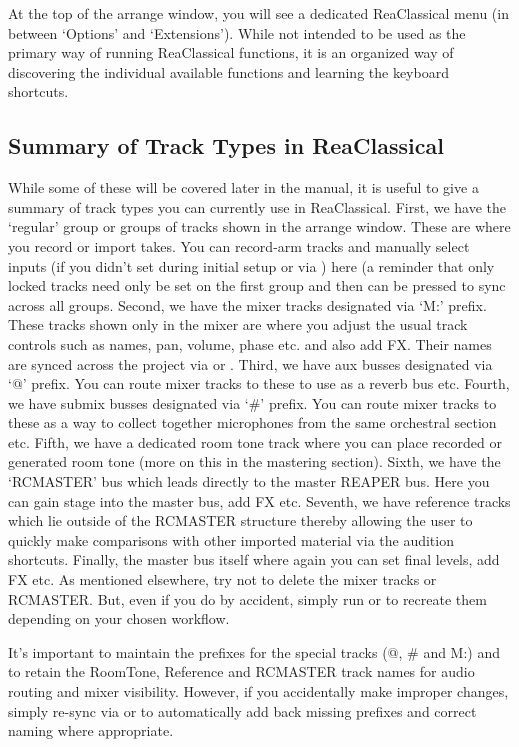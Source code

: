 \documentclass[10pt,american]{article}
\begin{document}
At the top of the arrange window, you will see a dedicated ReaClassical menu (in
between `Options' and `Extensions'). While not intended to be used as the
primary way of running ReaClassical functions, it is an organized way of
discovering the individual available functions and learning the keyboard
shortcuts.

\subsection{Summary of Track Types in ReaClassical}

While some of these will be covered later in the manual, it is useful to give a
summary of track types you can currently use in ReaClassical. First, we have the
`regular' group or groups of tracks shown in the arrange window. These are where
you record or import takes. You can record-arm tracks and manually select inputs
(if you didn't set during initial setup or via ) here (a reminder
that only locked tracks need only be set on the first group and then 
can be pressed to sync across all groups. Second, we have the mixer tracks
designated via `M:' prefix. These tracks shown only in the mixer are where you
adjust the usual track controls such as names, pan, volume, phase etc. and also
add FX. Their names are synced across the project via  or .
Third, we have aux busses designated via `@' prefix. You can route mixer tracks
to these to use as a reverb bus etc. Fourth, we have submix busses designated
via `\#' prefix. You can route mixer tracks to these as a way to collect
together microphones from the same orchestral section etc. Fifth, we have a
dedicated room tone track where you can place recorded or generated room tone
(more on this in the mastering section). Sixth, we have the `RCMASTER' bus which
leads directly to the master REAPER bus. Here you can gain stage into the master
bus, add FX etc. Seventh, we have reference tracks which lie outside of the
RCMASTER structure thereby allowing the user to quickly make comparisons with
other imported material via the audition shortcuts. Finally, the master bus
itself where again you can set final levels, add FX etc. As mentioned elsewhere,
try not to delete the mixer tracks or RCMASTER. But, even if you do by accident,
simply run  or  to recreate them depending on your chosen
workflow.

It's important to maintain the prefixes for the special tracks (@, \# and M:)
and to retain the RoomTone, Reference and RCMASTER track names for audio routing
and mixer visibility. However, if you accidentally make improper changes, simply
re-sync via  or  to automatically add back missing prefixes
and correct naming where appropriate. 
\end{document}
